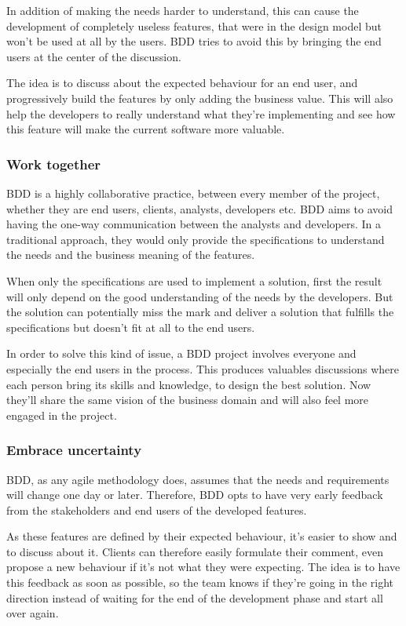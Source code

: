 In addition of making the needs harder to understand, this can cause the
development of completely useless features, that were in the design model but
won't be used at all by the users.
BDD tries to avoid this by bringing the end users at the center of the
discussion.

The idea is to discuss about the expected behaviour for an end user, and
progressively build the features by only adding the business value.
This will also help the developers to really understand what they're
implementing and see how this feature will make the current software more
valuable.

\subsubsection{Work together}
BDD is a highly collaborative practice, between every member of the project,
whether they are end users, clients, analysts, developers etc.
BDD aims to avoid having the one-way communication between the analysts and
developers.
In a traditional approach, they would only provide the specifications to
understand the needs and the business meaning of the features.

When only the specifications are used to implement a solution, first the
result will only depend on the good understanding of the needs by the
developers.
But the solution can potentially miss the mark and deliver a solution that
fulfills the specifications but doesn't fit at all to the end users.

In order to solve this kind of issue, a BDD project involves everyone and
especially the end users in the process.
This produces valuables discussions where each person bring its skills and
knowledge, to design the best solution.
Now they'll share the same vision of the business domain and will also feel more
engaged in the project.

\subsubsection{Embrace uncertainty}
BDD, as any agile methodology does, assumes that the needs and requirements
will change one day or later.
Therefore, BDD opts to have very early feedback from the stakeholders and end
users of the developed features.

As these features are defined by their expected behaviour, it's easier to
show and to discuss about it.
Clients can therefore easily formulate their comment, even propose a new
behaviour if it's not what they were expecting.
The idea is to have this feedback as soon as possible, so the team knows if
they're going in the right direction instead of waiting for the end of the
development phase and start all over again.

